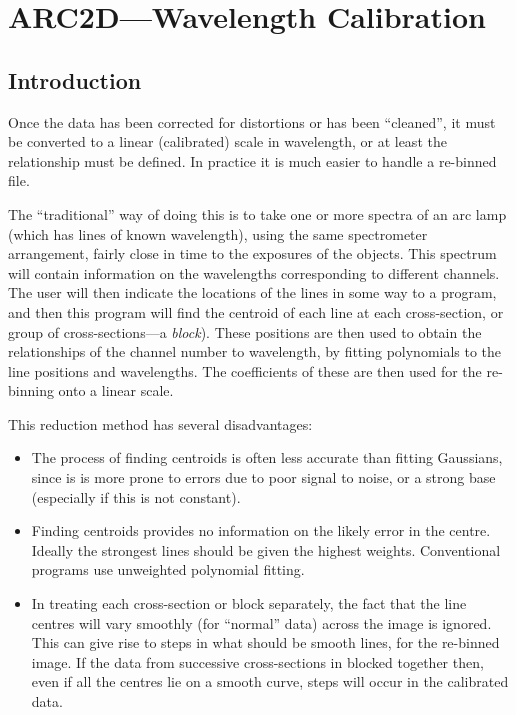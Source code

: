 \section{ARC2D---Wavelength Calibration}
\label{sc.arc2d}
\subsection{Introduction}

Once the data has been corrected for distortions or has been
``cleaned'', it must be converted to a linear (calibrated) scale in
wavelength, or at least the relationship must be defined.
In practice it is much easier to handle a re-binned file.

The ``traditional'' way of doing this is to take one or more spectra
of an arc lamp (which has lines of known wavelength), using the same
spectrometer arrangement, fairly close in time to the exposures of the
objects. This spectrum will contain information on the wavelengths
corresponding to different channels. The user will then indicate the
locations of the lines in some way to a program, and then this program
will find the centroid of each line at each cross-section, or group of
cross-sections---a {\em block}). These positions are then used to obtain
the relationships of the channel number to wavelength, by fitting
polynomials to the line positions and wavelengths. The coefficients of
these are then used for the re-binning onto a linear scale.

This reduction method has several disadvantages:
\begin{itemize}
\item The process of finding centroids is often less accurate than
fitting Gaussians, since is is more prone to errors due to poor signal
to noise, or a strong base (especially if this is not constant).
\item Finding centroids provides no information on the likely error
in the centre. Ideally the strongest lines should be given the highest
weights. Conventional programs use unweighted polynomial fitting.
\item In treating each cross-section or block separately, the fact that
the line centres will vary smoothly (for ``normal'' data) across the
image is ignored. This can give rise to steps in what should be smooth
lines, for the re-binned image. If the data from successive
cross-sections in blocked together then, even if all the centres lie on
a smooth curve, steps will occur in the calibrated data.
\end{itemize}

